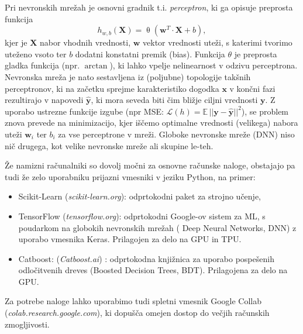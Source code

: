 \documentclass[slovene,11pt,a4paper]{article}
\begin{document}
Pri nevronskih mrežah je osnovni gradnik t.i. \emph{perceptron}, ki ga opisuje preprosta funkcija
\[h_{w,b}(\mathbf{X})=\operatorname{\theta}\left(\mathbf{w}^{T} \cdot \mathbf{X} + b\right),\]
kjer je $\mathbf{X}$ nabor vhodnih vrednosti, $\mathbf{w}$ vektor vrednosti uteži, s katerimi
tvorimo uteženo vsoto ter $b$ dodatni konstatni premik (bias). Funkcija $\theta$ je preprosta
gladka funkcija (npr. $\arctan$), ki lahko vpelje nelinearnost v odzivu perceptrona. Nevronska
mreža je nato sestavljena iz (poljubne) topologije takšnih perceptronov, ki na začetku
sprejme karakteristiko dogodka $\mathbf{x}$ v končni fazi rezultirajo v napovedi $\mathbf{\hat{y}}$, ki 
mora seveda biti čim bližje ciljni vrednosti $\mathbf{y}$. Z uporabo ustrezne funkcije 
izgube (npr MSE: \(\mathcal{L}(h)=\mathbb{E}\, ||\mathbf{y}-\mathbf{\hat{y}}||^2\)), se problem znova prevede na
minimizacijo, kjer iščemo optimalne vrednosti (velikega) nabora uteži $\mathbf{w}_i$ ter
$b_i$ za vse perceptrone v mreži. Globoke nevronske mreže (DNN) niso nič drugega, kot 
velike nevronske mreže ali skupine le-teh. 

Že namizni računalniki so
dovolj močni za  osnovne računske naloge, obstajajo pa tudi že zelo uporabniku prijazni vmesniki v jeziku Python, na primer:
\begin{itemize}
  \item Scikit-Learn (\emph{scikit-learn.org}): odprtokodni paket za strojno učenje,
  \item TensorFlow (\emph{tensorflow.org}): odprtokodni Google-ov sistem za ML, s poudarkom na globokih nevronskih mrežah 
  ( Deep Neural Networks, DNN) z uporabo vmesnika Keras. Prilagojen za delo na GPU in TPU. 
  \item Catboost: (\emph{Catboost.ai}) : odprtokodna knjižnica za uporabo pospešenih odločitvenih dreves (Boosted Decision Trees, BDT). Prilagojena za delo na GPU.
\end{itemize}
Za potrebe naloge lahko uporabimo tudi spletni vmesnik Google Collab (\emph{colab.research.google.com}), ki dopušča omejen dostop 
do večjih računskih zmogljivosti.
\end{document}
